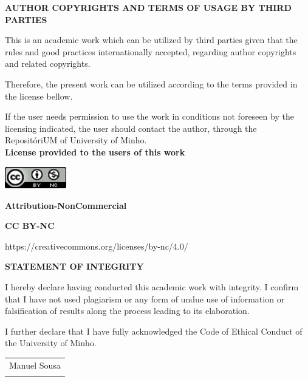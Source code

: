 \begin{center}
    \textbf{AUTHOR COPYRIGHTS AND TERMS OF USAGE BY THIRD PARTIES}
\end{center}
        
This is an academic work which can be utilized by third parties given that the rules and good practices internationally accepted, regarding author copyrights and related copyrights.

Therefore, the present work can be utilized according to the terms provided in the license bellow.

If the user needs permission to use the work in conditions not foreseen by the licensing indicated, the user should contact the author, through the RepositóriUM of University of Minho.\\[0.5cm]

\textbf{License provided to the users of this work}

\includegraphics[width=0.2\textwidth]{images/license.png}

\textbf{Attribution-NonCommercial}

\textbf{CC BY-NC}

https://creativecommons.org/licenses/by-nc/4.0/

\newpage

\begin{center}
    \textbf{STATEMENT OF INTEGRITY}
\end{center}

I hereby declare having conducted this academic work with integrity. I confirm that I have not used plagiarism or any form of undue use of information or falsification of results along the process leading to its elaboration.

I further declare that I have fully acknowledged the Code of Ethical Conduct of the University of Minho.\\[0.5cm]

\begin{flushright}
\begin{tabular}{@{}p{1.2in}}
Manuel Sousa \\
\hrulefill \\
\end{tabular}
\end{flushright}